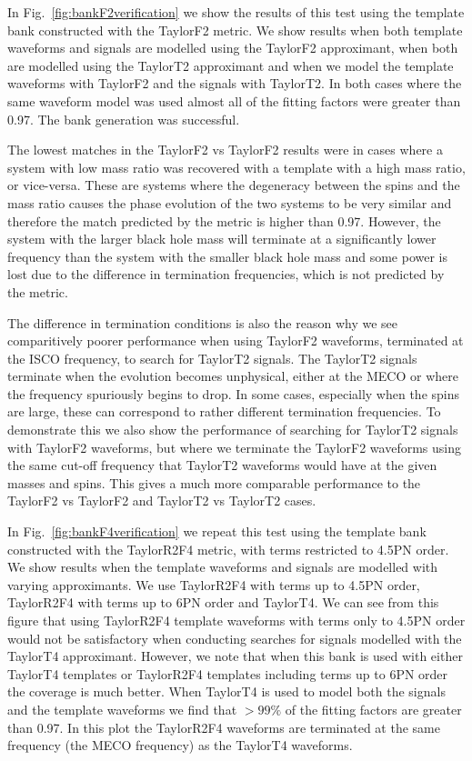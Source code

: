 In Fig.~\ref{fig:bankF2verification} we show the results of this test using
the template bank constructed with the TaylorF2 metric. We show results when
both template waveforms and signals are modelled using the TaylorF2
approximant, when both are modelled using the TaylorT2 approximant and when we
model the template waveforms with TaylorF2 and the signals with TaylorT2.
In both cases where the same waveform model was used almost all of the fitting
factors were greater than 0.97. The bank generation was successful.

The lowest matches in the TaylorF2 vs TaylorF2 results were in cases
where a system with low mass ratio was recovered with a template with a high
mass ratio, or vice-versa. These are systems where the degeneracy between the
spins and the mass ratio \cite{Baird:2012cu} causes
the phase evolution of the two systems to be very similar and therefore the
match predicted by the metric is higher than 0.97.
However, the system with the larger black hole mass will terminate at a 
significantly lower frequency than the system with the smaller black hole mass
and some power is lost due to the difference in termination frequencies, which
is not predicted by the metric.

The difference in termination conditions is also the reason why we see
comparitively poorer performance when using TaylorF2 waveforms, terminated
at the \ac{ISCO} frequency, to search for TaylorT2 signals. The TaylorT2
signals terminate when the evolution becomes unphysical,
either at the \ac{MECO} or where the frequency spuriously begins to drop. In
some cases, especially when the spins
are large, these can correspond to rather different termination frequencies. To
demonstrate this we also show the performance
of searching for TaylorT2 signals with TaylorF2 waveforms,
but where we terminate the TaylorF2 waveforms using the same cut-off frequency
that TaylorT2 waveforms would have at the given masses and spins.
This gives a much more comparable performance to the TaylorF2 vs TaylorF2
and TaylorT2 vs TaylorT2 cases.

In Fig.~\ref{fig:bankF4verification} we repeat this test using
the template bank constructed with the TaylorR2F4 metric, with terms restricted
to 4.5\ac{PN} order. We show results when the template waveforms and signals
are modelled with varying approximants. We use TaylorR2F4 with terms up to
4.5\ac{PN} order, TaylorR2F4 with terms up to 6\ac{PN} order and TaylorT4.
We can see from this figure that using TaylorR2F4 template waveforms
with terms only to 4.5\ac{PN} order would not be satisfactory when conducting
searches for signals modelled with the TaylorT4 approximant. However, we note
that when this bank is used with either TaylorT4 templates or TaylorR2F4
templates including terms up to 6\ac{PN} order the coverage is much better.
When TaylorT4 is used to model both the signals and the template waveforms we
find that $>99\%$ of the fitting factors are greater than
0.97. In this plot the TaylorR2F4 waveforms are terminated at
the same frequency (the \ac{MECO} frequency) as the TaylorT4 waveforms.

